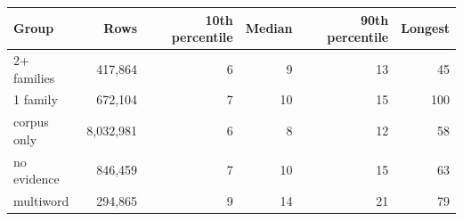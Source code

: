\begin{tabular}{lrrrrr}
\toprule
Group & Rows & 10th percentile & Median & 90th percentile & Longest \\
\midrule
2+ families & 417,864 & 6 & 9 & 13 & 45 \\
1 family & 672,104 & 7 & 10 & 15 & 100 \\
corpus only & 8,032,981 & 6 & 8 & 12 & 58 \\
no evidence & 846,459 & 7 & 10 & 15 & 63 \\
multiword & 294,865 & 9 & 14 & 21 & 79 \\
\bottomrule
\end{tabular}
